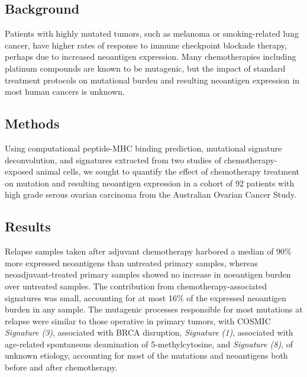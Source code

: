 \subsection*{Background}
Patients with highly mutated tumors, such as melanoma or smoking-related lung cancer, have higher rates of response to immune checkpoint blockade therapy, perhaps due to increased neoantigen expression. Many chemotherapies including platinum compounds are known to be mutagenic, but the impact of standard treatment protocols on mutational burden and resulting neoantigen expression in most human cancers is unknown.


\subsection*{Methods}

Using computational peptide-MHC binding prediction, mutational signature deconvolution, and signatures extracted from two studies of chemotherapy-exposed animal cells, we sought to quantify the effect of chemotherapy treatment on mutation and resulting neoantigen expression in a cohort of 92 patients with high grade serous ovarian carcinoma from the Australian Ovarian Cancer Study.


\subsection*{Results}
Relapse samples taken after adjuvant chemotherapy harbored a median of 90\% more expressed neoantigens than untreated primary samples, whereas neoadjuvant-treated primary samples showed no increase in noeantigen burden over untreated samples. The contribution from chemotherapy-associated signatures was small, accounting for at most 16\% of the expressed neoantigen burden in any sample. The mutagenic processes responsible for most mutations at relapse were similar to those operative in primary tumors, with COSMIC \textit{Signature (3)}, associated with BRCA disruption, \textit{Signature (1)}, associated with age-related spontaneous deamination of 5-methylcytosine, and \textit{Signature (8)}, of unknown etiology, accounting for most of the mutations and neoantigens both before and after chemotherapy.

